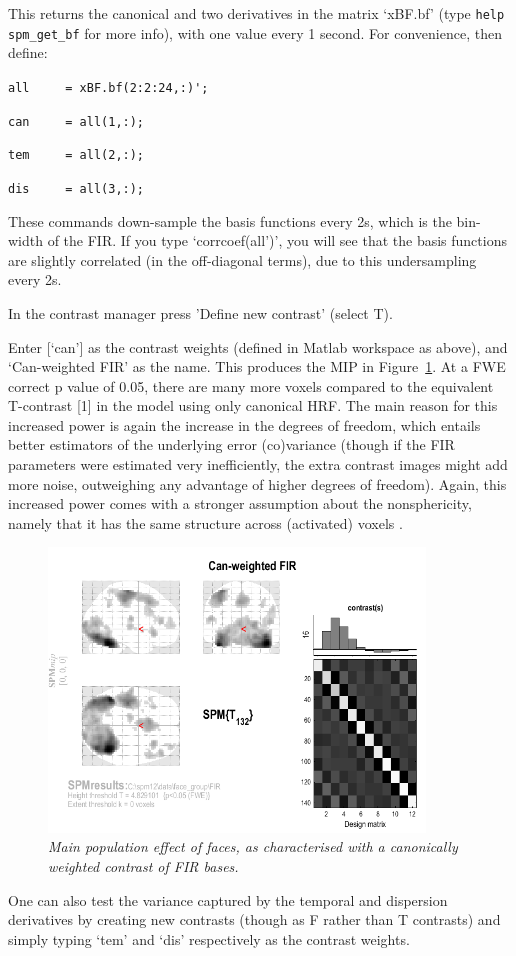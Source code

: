 This returns the canonical and two derivatives in the matrix `xBF.bf' (type \verb!help spm_get_bf! for more info), with one value every 1 second. For convenience, then define:
\bi
\item{\verb!all		= xBF.bf(2:2:24,:)';!}
\item{\verb!can 	= all(1,:);!}
\item{\verb!tem 	= all(2,:);!}
\item{\verb!dis 	= all(3,:);!}
\ei

These commands down-sample the basis functions every 2s, which is the bin-width of the FIR.
If you type `corrcoef(all')', you will see that the basis functions are slightly correlated (in the off-diagonal terms), due to this undersampling every 2s.
\bi
\item{In the contrast manager press 'Define new contrast' (select T).}
\item{Enter [`can'] as the contrast weights (defined in Matlab workspace as above), and `Can-weighted FIR' as the name.}
\ei
This produces the MIP in Figure~\ref{can_weighted_fir}. At a FWE correct p value of 0.05, there are many more voxels compared to the equivalent T-contrast [1] in the model using only canonical HRF. The main reason for this increased power is again the increase in the degrees of freedom, which entails better estimators of the underlying error (co)variance (though if the FIR parameters were estimated very inefficiently, the extra contrast images might add more noise, outweighing any advantage of higher degrees of freedom). Again, this increased power comes with a stronger assumption about the nonsphericity, namely that it has the same structure across (activated) voxels \cite{daniel_hbf2}.
\begin{figure}
\begin{center}
\includegraphics[width=100mm]{faces_group/can_weighted_fir}
\caption{\em Main population effect of faces, as characterised with a canonically weighted contrast of FIR bases. \label{can_weighted_fir}}
\end{center}
\end{figure}
One can also test the variance captured by the temporal and dispersion derivatives by creating new contrasts (though as F rather than T contrasts) and simply typing `tem' and `dis' respectively as the contrast weights.

